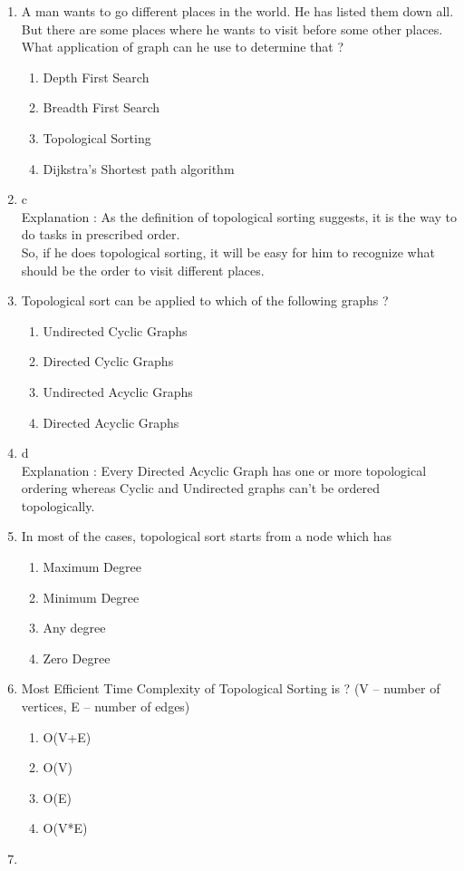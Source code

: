 ﻿\documentclass{article}
\newcommand{\answer}{\item [$\rightarrow$]}
\begin{document}
\begin{enumerate}
		\item A man wants to go different places in the world.
		He has listed them down all. \\
		But there are some places where he wants to visit before some other places. \\
		What application of graph can he use to determine that ?
		\begin{enumerate}[label=\alph*) ]
			\item Depth First Search
			\item Breadth First Search
			\item Topological Sorting
			\item Dijkstra's Shortest path algorithm
		\end{enumerate}
		\answer c \\
		Explanation : As the definition of topological sorting suggests, it is the way to do tasks in prescribed order. \\
		So, if he does topological sorting, it will be easy for him to recognize what should be the order to visit different places.
		
		\item Topological sort can be applied to which of the following graphs ?
		\begin{enumerate}[label=\alph*) ]
			\item Undirected Cyclic Graphs
			\item Directed Cyclic Graphs
			\item Undirected Acyclic Graphs
			\item Directed Acyclic Graphs
		\end{enumerate}
		\answer d \\
		Explanation : Every Directed Acyclic Graph has one or more topological ordering whereas Cyclic and Undirected graphs can't be ordered topologically.
		
		\item In most of the cases, topological sort starts from a node which has \underline{\hspace{5em}}
		\begin{enumerate}[label=\alph*) ]
			\item Maximum Degree
			\item Minimum Degree
			\item Any degree
			\item Zero Degree
		\end{enumerate}
		
		\item Most Efficient Time Complexity of Topological Sorting is ? (V – number of vertices, E – number of edges)
		\begin{enumerate}[label=\alph*) ]
			\item O(V+E)
			\item O(V)
			\item O(E)
			\item O(V*E)
		\end{enumerate}
		\answer 
	\end{enumerate} \newpage
\end{document}
